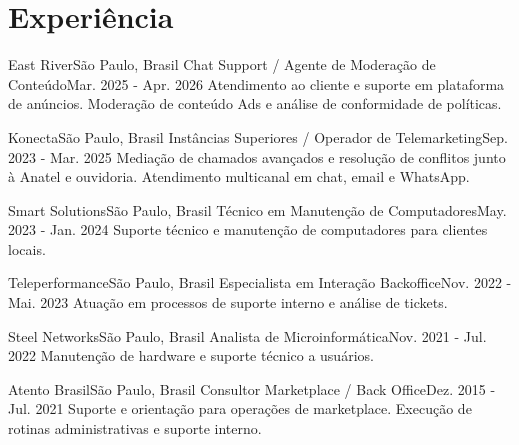 \section{Experiência}
  \resumeSubHeadingListStart

    \resumeSubheading
      {East River}{São Paulo, Brasil}
      {Chat Support / Agente de Moderação de Conteúdo}{Mar. 2025 - Apr. 2026}
      \resumeItemListStart
          {Atendimento ao cliente e suporte em plataforma de anúncios.}
          {Moderação de conteúdo Ads e análise de conformidade de políticas.}
      \resumeItemListEnd

    \resumeSubheading
      {Konecta}{São Paulo, Brasil}
      {Instâncias Superiores / Operador de Telemarketing}{Sep. 2023 - Mar. 2025}
      \resumeItemListStart
          {Mediação de chamados avançados e resolução de conflitos junto à Anatel e ouvidoria.}
          {Atendimento multicanal em chat, email e WhatsApp.}
      \resumeItemListEnd

    \resumeSubheading
      {Smart Solutions}{São Paulo, Brasil}
      {Técnico em Manutenção de Computadores}{May. 2023 - Jan. 2024}
      \resumeItemListStart
          {Suporte técnico e manutenção de computadores para clientes locais.}
      \resumeItemListEnd

    \resumeSubheading
      {Teleperformance}{São Paulo, Brasil}
      {Especialista em Interação Backoffice}{Nov. 2022 - Mai. 2023}
      \resumeItemListStart
          {Atuação em processos de suporte interno e análise de tickets.}
      \resumeItemListEnd

    \resumeSubheading
      {Steel Networks}{São Paulo, Brasil}
      {Analista de Microinformática}{Nov. 2021 - Jul. 2022}
      \resumeItemListStart
          {Manutenção de hardware e suporte técnico a usuários.}
      \resumeItemListEnd

    \resumeSubheading
      {Atento Brasil}{São Paulo, Brasil}
      {Consultor Marketplace / Back Office}{Dez. 2015 - Jul. 2021}
      \resumeItemListStart
          {Suporte e orientação para operações de marketplace.}
          {Execução de rotinas administrativas e suporte interno.}
      \resumeItemListEnd

